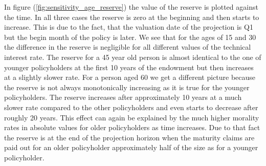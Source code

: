In figure (\ref{fig:sensitivity_age_reserve}) the value of the reserve is plotted against the time. In all three cases the reserve is zero at the beginning and then starts to increase. This is due to the fact, that the valuation date of the projection is Q1 but the begin month of the policy is later. We see that for the ages of 15 and 30 the difference in the reserve is negligible for all different values of the technical interest rate. The reserve for a 45 year old person is almost identical to the one of younger policyholders at the first 10 years of the endowment but then increases at a slightly slower rate. For a person aged 60 we get a different picture because the reserve is not always monotonically increasing as it is true for the younger policyholders. The reserve increases after approximately 10 years at a much slower rate compared to the other policyholders and even starts to decrease after roughly 20 years. This effect can again be explained by the much higher morality rates in absolute values for older policyholders as time increases. Due to that fact the reserve is at the end of the projection horizon when the maturity claims are paid out for an older policyholder approximately half of the size as for a younger policyholder.

